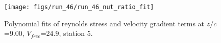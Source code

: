 \begin{figure}[H]
\centering
\texttt{[image: figs/run\_46/run\_46\_nut\_ratio\_fit]}
\caption{Polynomial fits of reynolds stress and velocity gradient terms at $z/c$=9.00, $V_{free}$=24.9, station 5.}
\label{fig:run_46_nut_ratio_fit}
\end{figure}


